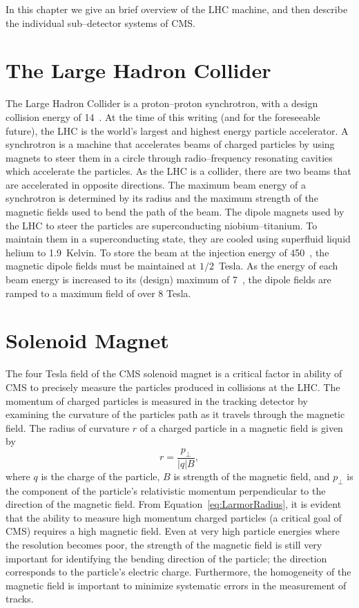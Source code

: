 In this chapter we give an brief overview of the LHC machine, and then describe
the individual sub--detector systems of CMS. 

\section{The Large Hadron Collider}
The Large Hadron Collider is a proton--proton synchrotron, with a design
collision energy of 14~\TeV.  At the time of this writing (and for the
foreseeable future), the LHC is the world's largest and highest energy particle
accelerator. A synchrotron is a machine that accelerates beams of charged
particles by using magnets to steer them in a circle through radio--frequency
resonating cavities which accelerate the particles. As the LHC is a collider,
there are two beams that are accelerated in opposite directions.  The maximum
beam energy of a synchrotron is determined by its radius and the maximum
strength of the magnetic fields used to bend the path of the beam.  The dipole
magnets used by the LHC to steer the particles are superconducting
niobium--titanium.  To maintain them in a superconducting state, they are cooled
using superfluid liquid helium to 1.9~Kelvin.  To store the beam at the
injection energy of 450~\GeV, the magnetic dipole fields must be maintained at
$1/2$~Tesla.  As the energy of each beam energy is increased to its (design)
maximum of 7~\TeV, the dipole fields are ramped to a maximum field of over 8
Tesla.
\section{Solenoid Magnet}
\label{sec:Magnet} The four Tesla field of the CMS solenoid magnet is a critical
factor in ability of CMS to precisely measure the particles produced in
collisions at the LHC\@. The momentum of charged particles is measured in the
tracking detector by examining the curvature of the particles path as it travels
through the magnetic field.  The radius of curvature $r$ of a charged particle
in a magnetic field is given by
\begin{equation}
  r = \frac{p_\perp}{|q| B},
  \label{eq:LarmorRadius}
\end{equation}
where $q$ is the charge of the particle, $B$ is strength of the magnetic field,
and $p_\perp$ is the component of the particle's relativistic momentum
perpendicular to the direction of the magnetic field.  From
Equation~\ref{eq:LarmorRadius}, it is evident that the ability to measure high
momentum charged particles (a critical goal of CMS) requires a high magnetic
field.  Even at very high particle energies where the resolution becomes poor,
the strength of the magnetic field is still very important for identifying the
bending direction of the particle; the direction corresponds to the particle's
electric charge.  Furthermore, the homogeneity of the magnetic field is
important to minimize systematic errors in the measurement of tracks.

